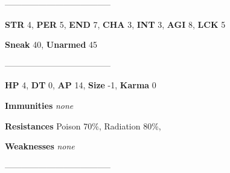 \documentclass[11pt,a4paper,twocolumn]{book}
\begin{document}
%		
%	
%		

	--------------------------------------

\noindent
\textbf{STR} 4, \textbf{PER} 5, \textbf{END} 7, \textbf{CHA} 3, \textbf{INT} 3, \textbf{AGI} 8, \textbf{LCK} 5

\noindent
\textbf{Sneak} 40, \textbf{Unarmed} 45 %

--------------------------------------

\noindent
\textbf{HP} 4, \textbf{DT} 0, \textbf{AP} 14, \textbf{Size} -1, \textbf{Karma} 0


\noindent
\textbf{Immunities} \emph{none} %

\noindent
\textbf{Resistances} Poison 70\%, Radiation 80\%,%

\noindent
\textbf{Weaknesses} \emph{none}%

--------------------------------------
	
\end{document}
